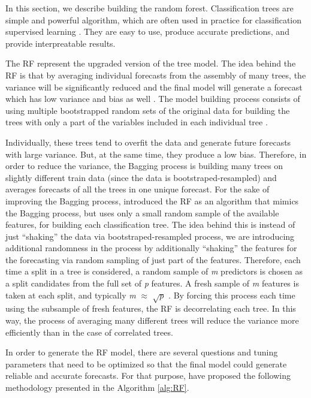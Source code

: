 \documentclass[preprint, 3p,
authoryear]{elsarticle} %
\begin{document}
In this section, we describe building the random forest. Classification
trees are simple and powerful algorithm, which are often used in
practice for classification supervised learning
\citep{friedman2001elements}. They are easy to use, produce accurate
predictions, and provide interpreatable results.

The RF represent the upgraded version of the tree model. The idea behind
the RF is that by averaging individual forecasts from the assembly of
many trees, the variance will be significantly reduced and the final
model will generate a forecast which has low variance and bias as well
\citep{friedman2001elements}. The model building process consists of
using multiple bootstrapped random sets of the original data for
building the trees with only a part of the variables included in each
individual tree \citep{breiman1996bagging}.

Individually, these trees tend to overfit the data and generate future
forecasts with large variance. But, at the same time, they produce a low
bias. Therefore, in order to reduce the variance, the Bagging process is
building many trees on slightly different train data (since the data is
bootstraped-resampled) and averages forecasts of all the trees in one
unique forecast. For the sake of improving the Bagging process,
\citet{breiman2001random} introduced the RF as an algorithm that mimics
the Bagging process, but uses only a small random sample of the
available features, for building each classification tree. The idea
behind this is instead of just ``shaking'' the data via
bootstraped-resampled process, we are introducing additional randomness
in the process by additionally ``shaking'' the features for the
forecasting via random sampling of just part of the features. Therefore,
each time a split in a tree is considered, a random sample of \emph{m}
predictors is chosen as a split candidates from the full set of \emph{p}
features. A fresh sample of \emph{m} features is taken at each split,
and typically \emph{m} \(\approx\) \(\sqrt p\)
\citep{friedman2001elements}. By forcing this process each time using
the subsample of fresh features, the RF is decorrelating each tree. In
this way, the process of averaging many different trees will reduce the
variance more efficiently than in the case of correlated trees.

In order to generate the RF model, there are several questions and
tuning parameters that need to be optimized so that the final model
could generate reliable and accurate forecasts. For that purpose,
\citet{friedman2001elements} have proposed the following methodology
presented in the Algorithm \ref{alg:RF}.
\end{document}
